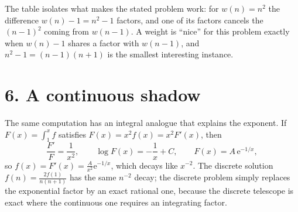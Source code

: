 \documentclass[12pt]{article}
\newcommand{\e}{\mathrm{e}}
\begin{document}
The table isolates what makes the stated problem work: for \(w(n)=n^2\)
the difference \(w(n)-1=n^2-1\) factors, and one of its factors cancels
the \((n-1)^2\) coming from \(w(n-1)\). A weight is ``nice'' for this
problem exactly when \(w(n)-1\) shares a factor with \(w(n-1)\), and
\(n^2-1=(n-1)(n+1)\) is the smallest interesting instance.

\section*{6. A continuous shadow}

The same computation has an integral analogue that explains the exponent.
If \(F(x)=\int_1^x f\) satisfies \(F(x)=x^2f(x)=x^2F'(x)\), then
\[
\frac{F'}{F}=\frac1{x^2},
\qquad
\log F(x)=-\frac1x+C,
\qquad
F(x)=A\,\e^{-1/x},
\]
so \(f(x)=F'(x)=\frac{A}{x^2}\e^{-1/x}\), which decays like \(x^{-2}\).
The discrete solution \(f(n)=\frac{2f(1)}{n(n+1)}\) has the same
\(n^{-2}\) decay; the discrete problem simply replaces the exponential
factor by an exact rational one, because the discrete telescope is exact
where the continuous one requires an integrating factor.
\end{document}
